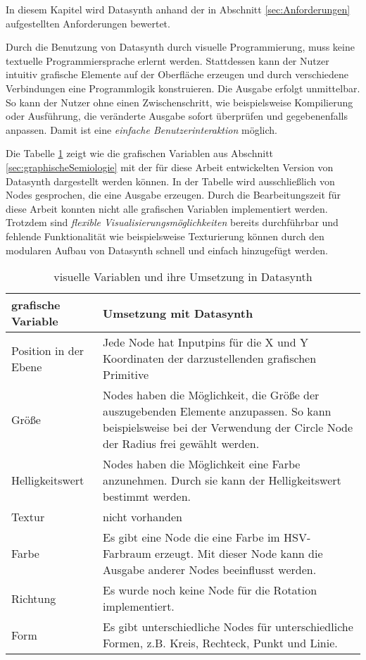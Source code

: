 \documentclass[a4paper, 12pt, DIVcalc, onepage, pdftex, headsepline, footsepline]{scrreprt}
\begin{document}
In diesem Kapitel wird Datasynth anhand der in Abschnitt \ref{sec:Anforderungen}
aufgestellten Anforderungen bewertet.

Durch die Benutzung von Datasynth durch visuelle Programmierung, muss keine
textuelle Programmiersprache erlernt werden. Stattdessen kann der Nutzer intuitiv
grafische Elemente auf der Oberfläche erzeugen und durch verschiedene Verbindungen
eine Programmlogik konstruieren. Die Ausgabe erfolgt unmittelbar. So kann der Nutzer
ohne einen Zwischenschritt, wie beispielsweise Kompilierung oder Ausführung, die
veränderte Ausgabe sofort überprüfen und gegebenenfalls anpassen. Damit ist eine
\textit{einfache Benutzerinteraktion} möglich.

Die Tabelle \ref{tab:vars} zeigt wie die grafischen Variablen aus Abschnitt
\ref{sec:graphischeSemiologie} mit der für diese Arbeit entwickelten Version von
Datasynth dargestellt werden können. In der Tabelle wird ausschließlich
von Nodes gesprochen, die eine Ausgabe erzeugen.
Durch die Bearbeitungszeit für diese Arbeit konnten nicht alle grafischen
Variablen implementiert werden. Trotzdem sind \textit{flexible Visualisierungsmöglichkeiten}
bereits durchführbar und fehlende Funktionalität wie beispielsweise Texturierung können
durch den modularen Aufbau von Datasynth schnell und einfach hinzugefügt werden.

\begin{table}
\centering
\begin{tabular}{|l|p{9cm}|}
\hline
\textbf{grafische Variable} & \textbf{Umsetzung mit Datasynth}\\
\hline
Position in der Ebene & Jede Node hat Inputpins für die X und Y Koordinaten der darzustellenden grafischen Primitive\\
\hline
Größe & Nodes haben die Möglichkeit, die Größe der auszugebenden Elemente anzupassen.
So kann beispielsweise bei der Verwendung der Circle Node der Radius frei gewählt werden.\\
\hline
Helligkeitswert & Nodes haben die Möglichkeit eine Farbe anzunehmen. Durch sie kann
der Helligkeitswert bestimmt werden.\\
\hline
Textur & nicht vorhanden\\
\hline
Farbe & Es gibt eine Node die eine Farbe im HSV-Farbraum erzeugt. Mit dieser Node kann die Ausgabe
anderer Nodes beeinflusst werden.\\
\hline
Richtung & Es wurde noch keine Node für die Rotation implementiert.\\
\hline
Form & Es gibt unterschiedliche Nodes für unterschiedliche Formen, z.B. Kreis, Rechteck, Punkt und Linie.\\
\hline
\end{tabular}
\caption{visuelle Variablen und ihre Umsetzung in Datasynth}
\label{tab:vars}
\end{table}
\end{document}
